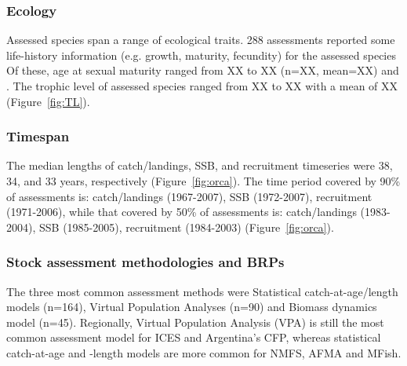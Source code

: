 \subsubsection*{Ecology}
Assessed species span a range of ecological traits.
288 assessments reported some life-history
information (e.g. growth, maturity, fecundity) for the assessed
species Of these, age at sexual maturity ranged from XX to XX (n=XX,
mean=XX) and . The trophic level of assessed species ranged from XX to
XX with a mean of XX (Figure~\ref{fig:TL}).




\subsubsection*{Timespan }


The median lengths of catch/landings, SSB, and recruitment timeseries
were 38, 34, and 33
years, respectively (Figure~\ref{fig:orca}).  The time period covered by 90\% of assessments
is: catch/landings (1967-2007), SSB
(1972-2007), recruitment (1971-2006), while that
covered by 50\% of assessments is: catch/landings
(1983-2004), SSB (1985-2005), recruitment
(1984-2003) (Figure~\ref{fig:orca}).

\subsubsection*{Stock assessment methodologies and BRPs}

The three most common assessment methods were
Statistical catch-at-age/length models (n=164), Virtual Population Analyses (n=90) and
Biomass dynamics model (n=45). Regionally, Virtual Population Analysis
(VPA) is still the most common assessment model for ICES and
Argentina's CFP, whereas statistical catch-at-age and -length models
are more common for NMFS, AFMA and MFish. 

